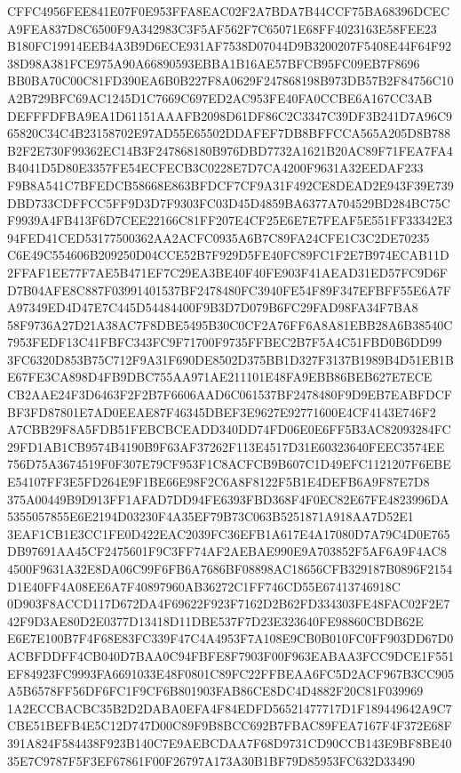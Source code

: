 \documentclass[UTF8,fontset=fandol,zihao=-4,a4paper]{ctexart}
\begin{document}
{{CFFC4956FEE841E07F0E953FFA8EAC02F2A7BDA7B44CCF75BA68396DCECA9FEA837D8C6500F9A342983C3F5AF562F7C65071E68FF4023163E58FEE23
B180FC19914EEB4A3B9D6ECE931AF7538D07044D9B3200207F5408E44F64F9238D98A381FCE975A90A66890593EBBA1B16AE57BFCB95FC09EB7F8696
BB0BA70C00C81FD390EA6B0B227F8A0629F247868198B973DB57B2F84756C10A2B729BFC69AC1245D1C7669C697ED2AC953FE40FA0CCBE6A167CC3AB
DEFFFDFBA9EA1D61151AAAFB2098D61DF86C2C3347C39DF3B241D7A96C965820C34C4B23158702E97AD55E65502DDAFEF7DB8BFFCCA565A205D8B788
B2F2E730F99362EC14B3F247868180B976DBD7732A1621B20AC89F71FEA7FA4B4041D5D80E3357FE54ECFECB3C0228E7D7CA4200F9631A32EEDAF233
F9B8A541C7BFEDCB58668E863BFDCF7CF9A31F492CE8DEAD2E943F39E739DBD733CDFFCC5FF9D3D7F9303FC03D45D4859BA6377A704529BD284BC75C
F9939A4FB413F6D7CEE22166C81FF207E4CF25E6E7E7FEAF5E551FF33342E394FED41CED53177500362AA2ACFC0935A6B7C89FA24CFE1C3C2DE70235
C6E49C554606B209250D04CCE52B7F929D5FE40FC89FC1F2E7B974ECAB11D2FFAF1EE77F7AE5B471EF7C29EA3BE40F40FE903F41AEAD31ED57FC9D6F
D7B04AFE8C887F03991401537BF2478480FC3940FE54F89F347EFBFF55E6A7FA97349ED4D47E7C445D54484400F9B3D7D079B6FC29FAD98FA34F7BA8
58F9736A27D21A38AC7F8DBE5495B30C0CF2A76FF6A8A81EBB28A6B38540C7953FEDF13C41FBFC343FC9F71700F9735FFBEC2B7F5A4C51FBD0B6DD99
3FC6320D853B75C712F9A31F690DE8502D375BB1D327F3137B1989B4D51EB1BE67FE3CA898D4FB9DBC755AA971AE211101E48FA9EBB86BEB627E7ECE
CB2AAE24F3D6463F2F2B7F6606AAD6C061537BF2478480F9D9EB7EABFDCFBF3FD87801E7AD0EEAE87F46345DBEF3E9627E92771600E4CF4143E746F2
A7CBB29F8A5FDB51FEBCBCEADD340DD74FD06E0E6FF5B3AC82093284FC29FD1AB1CB9574B4190B9F63AF37262F113E4517D31E60323640FEEC3574EE
756D75A3674519F0F307E79CF953F1C8ACFCB9B607C1D49EFC1121207F6EBEE54107FF3E5FD264E9F1BE66E98F2C6A8F8122F5B1E4DEFB6A9F87E7D8
375A00449B9D913FF1AFAD7DD94FE6393FBD368F4F0EC82E67FE4823996DA5355057855E6E2194D03230F4A35EF79B73C063B5251871A918AA7D52E1
3EAF1CB1E3CC1FE0D422EAC2039FC36EFB1A617E4A17080D7A79C4D0E765DB97691AA45CF2475601F9C3FF74AF2AEBAE990E9A703852F5AF6A9F4AC8
4500F9631A32E8DA06C99F6FB6A7686BF08898AC18656CFB329187B0896F2154D1E40FF4A08EE6A7F40897960AB36272C1FF746CD55E67413746918C
0D903F8ACCD117D672DA4F69622F923F7162D2B62FD334303FE48FAC02F2E742F9D3AE80D2E0377D13418D11DBE537F7D23E323640FE98860CBDB62E
E6E7E100B7F4F68E83FC339F47C4A4953F7A108E9CB0B010FC0FF903DD67D0ACBFDDFF4CB040D7BAA0C94FBFE8F7903F00F963EABAA3FCC9DCE1F551
EF84923FC9993FA6691033E48F0801C89FC22FFBEAA6FC5D2ACF967B3CC905A5B6578FF56DF6FC1F9CF6B801903FAB86CE8DC4D4882F20C81F039969
1A2ECCBACBC35B2D2DABA0EFA4F84EDFD56521477717D1F189449642A9C7CBE51BEFB4E5C12D747D00C89F9B8BCC692B7FBAC89FEA7167F4F372E68F
391A824F584438F923B140C7E9AEBCDAA7F68D9731CD90CCB143E9BF8BE4035E7C9787F5F3EF67861F00F26797A173A30B1BF79D85953FC632D33490
}}
\end{document}
